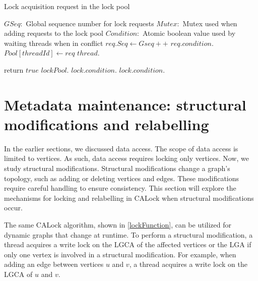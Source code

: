 		

\begin{algorithm}
	\caption{Lock acquisition request in the lock pool}\label{lockFunction}
	\begin{algorithmic}[1]
		\State $GSeq: $ Global sequence number for lock requests
		\State $Mutex: $ Mutex used when adding requests to the lock pool
		\State $Condition:$ Atomic boolean value used by waiting threads when in conflict
		\Statex
		\State {}
		\State $req.Seq \gets Gseq++$ \label{seqNoAllocation}
		\State $req.condition.$ \label{waitTrue}
		\State $Pool[threadId] \gets req$ \label{addToPool}
		\State {}
		 \label{conflictCheck}
		\State $thread.$
		\EndIf
		
		\EndFor
		\State return $true$
		\EndProcedure
		\Statex
		\State $lockPool.$
		\State $lock.condition.$
		\State $lock.condition.$
		\EndProcedure
	\end{algorithmic}
\end{algorithm}






\section{Metadata maintenance: structural modifications and relabelling}

In the earlier sections, we discussed data access. The scope of data access is limited to vertices. As such, data access requires locking only vertices. Now, we study structural modifications. Structural modifications change a graph's topology, such as adding or deleting vertices and edges. These modifications require careful handling to ensure consistency. This section will explore the mechanisms for locking and relabelling in CALock when structural modifications occur.

The same CALock algorithm, shown in \cref{lockFunction}, can be utilized for dynamic graphs that change at runtime. 
To perform a structural modification, a thread acquires a write lock on the LGCA of the affected vertices or the LGA if only one vertex is involved in a structural modification. For example, when adding an edge between vertices $u$ and $v$, a thread acquires a write lock on the LGCA of $u$ and $v$. 


